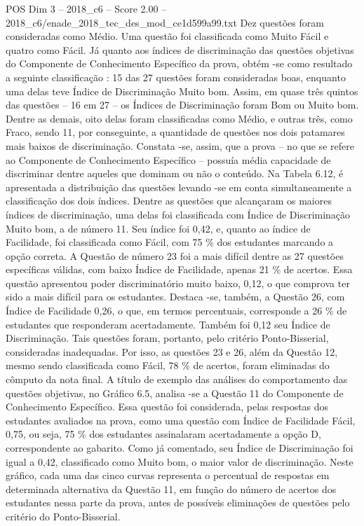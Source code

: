 \begin{textsample}{POS Dim 3 – 2018\_c6 – Score 2.00 – 2018\_c6/enade\_2018\_tec\_des\_mod\_ce1d599a99.txt}
Dez questões foram consideradas como Médio.
Uma questão foi classificada como Muito Fácil e quatro como Fácil.
Já quanto aos índices de discriminação das questões objetivas do Componente de Conhecimento Específico da prova, obtém -se como resultado a seguinte classificação : 15 das 27 questões foram consideradas boas, enquanto uma delas teve Índice de Discriminação Muito bom.
Assim, em quase três quintos das questões – 16 em 27 – os Índices de Discriminação foram Bom ou Muito bom.
Dentre as demais, oito delas foram classificadas como Médio, e outras três, como Fraco, sendo 11, por conseguinte, a quantidade de questões nos dois patamares mais baixos de discriminação.
Constata -se, assim, que a prova – no que se refere ao Componente de Conhecimento Específico – possuía média capacidade de discriminar dentre aqueles que dominam ou não o conteúdo.
Na Tabela 6.12, é apresentada a distribuição das questões levando -se em conta simultaneamente a classificação dos dois índices.
Dentre as questões que alcançaram os maiores índices de discriminação, uma delas foi classificada com Índice de Discriminação Muito bom, a de número 11.
Seu índice foi 0,42, e, quanto ao índice de Facilidade, foi classificada como Fácil, com 75 \% dos estudantes marcando a opção correta.
A Questão de número 23 foi a mais difícil dentre as 27 questões específicas válidas, com baixo Índice de Facilidade, apenas 21 \% de acertos.
Essa questão apresentou poder discriminatório muito baixo, 0,12, o que comprova ter sido a mais difícil para os estudantes.
Destaca -se, também, a Questão 26, com Índice de Facilidade 0,26, o que, em termos percentuais, corresponde a 26 \% de estudantes que responderam acertadamente.
Também foi 0,12 seu Índice de Discriminação.
Tais questões foram, portanto, pelo critério Ponto-Bisserial, consideradas inadequadas.
Por isso, as questões 23 e 26, além da Questão 12, mesmo sendo classificada como Fácil, 78 \% de acertos, foram eliminadas do cômputo da nota final.
A título de exemplo das análises do comportamento das questões objetivas, no Gráfico 6.5, analisa -se a Questão 11 do Componente de Conhecimento Específico.
Essa questão foi considerada, pelas respostas dos estudantes avaliados na prova, como uma questão com Índice de Facilidade Fácil, 0,75, ou seja, 75 \% dos estudantes assinalaram acertadamente a opção D, correspondente ao gabarito.
Como já comentado, seu Índice de Discriminação foi igual a 0,42, classificado como Muito bom, o maior valor de discriminação.
Neste gráfico, cada uma das cinco curvas representa o percentual de respostas em determinada alternativa da Questão 11, em função do número de acertos dos estudantes nessa parte da prova, antes de possíveis eliminações de questões pelo critério do Ponto-Bisserial.

\end{textsample}
